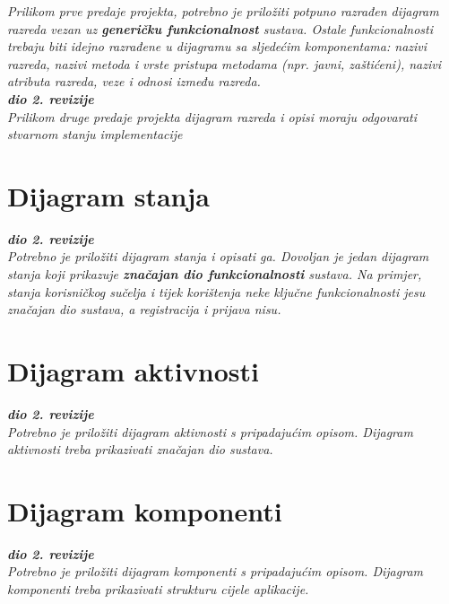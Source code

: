 			
			\textit{Prilikom prve predaje projekta, potrebno je priložiti potpuno razrađen dijagram razreda vezan uz \textbf{generičku funkcionalnost} sustava. Ostale funkcionalnosti trebaju biti idejno razrađene u dijagramu sa sljedećim komponentama: nazivi razreda, nazivi metoda i vrste pristupa metodama (npr. javni, zaštićeni), nazivi atributa razreda, veze i odnosi između razreda.}\\
			
			\textbf{\textit{dio 2. revizije}}\\			
			
			\textit{Prilikom druge predaje projekta dijagram razreda i opisi moraju odgovarati stvarnom stanju implementacije}
			
			
			
			\eject
		
		\section{Dijagram stanja}
			
			
			\textbf{\textit{dio 2. revizije}}\\
			
			\textit{Potrebno je priložiti dijagram stanja i opisati ga. Dovoljan je jedan dijagram stanja koji prikazuje \textbf{značajan dio funkcionalnosti} sustava. Na primjer, stanja korisničkog sučelja i tijek korištenja neke ključne funkcionalnosti jesu značajan dio sustava, a registracija i prijava nisu. }
			
			
			\eject 
		
		\section{Dijagram aktivnosti}
			
			\textbf{\textit{dio 2. revizije}}\\
			
			 \textit{Potrebno je priložiti dijagram aktivnosti s pripadajućim opisom. Dijagram aktivnosti treba prikazivati značajan dio sustava.}
			
			\eject
		\section{Dijagram komponenti}
		
			\textbf{\textit{dio 2. revizije}}\\
		
			 \textit{Potrebno je priložiti dijagram komponenti s pripadajućim opisom. Dijagram komponenti treba prikazivati strukturu cijele aplikacije.}
